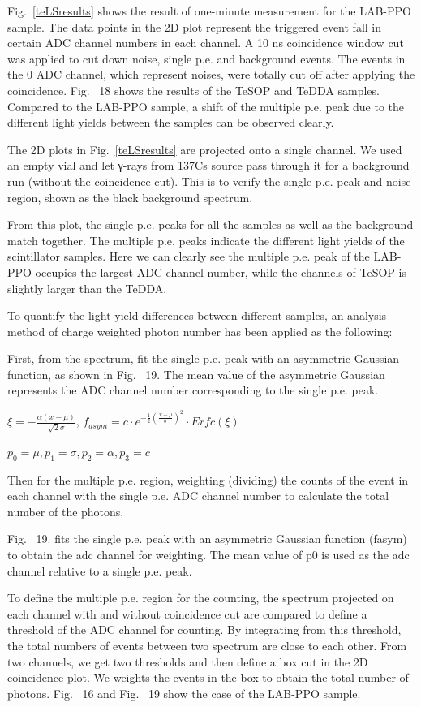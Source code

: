 Fig.~\ref{teLSresults} shows the result of one-minute measurement for the LAB-PPO sample. The data points in the 2D plot represent the triggered event fall in certain ADC channel numbers in each channel. A 10 ns coincidence window cut was applied to cut down noise, single p.e. and background events. The events in the 0 ADC channel, which represent noises, were totally cut off after applying the coincidence. Fig.~ 18 shows the results of the TeSOP and TeDDA samples.  Compared to the LAB-PPO sample, a shift of the multiple p.e. peak due to the different light yields between the samples can be observed clearly.

The 2D plots in Fig.~\ref{teLSresults} are projected onto a single channel. We used an empty vial and let γ-rays from 137Cs source pass through it for a background run (without the coincidence cut). This is to verify the single p.e. peak and noise region, shown as the black background spectrum.

From this plot, the single p.e. peaks for all the samples as well as the background match together. The multiple p.e. peaks indicate the different light yields of the scintillator samples. Here we can clearly see the multiple p.e. peak of the LAB-PPO occupies the largest ADC channel number, while the channels of TeSOP is slightly larger than the TeDDA. 

To quantify the light yield differences between different samples, an analysis method of charge weighted photon number has been applied as the following:

First, from the spectrum, fit the single p.e. peak with an asymmetric Gaussian function, as shown in Fig.~ 19. The mean value of the asymmetric Gaussian represents the ADC channel number corresponding to the single p.e. peak.

$\xi=-\frac{\alpha(x-\mu)}{\sqrt 2\sigma}$,
$f_{asym}=c\cdot e^{-\frac{1}{2}(\frac{x-\mu}{\sigma})^2}\cdot Erfc(\xi)$

$p_0=\mu,p_1=\sigma,p_2=\alpha, p_3=c$ 

Then for the multiple p.e. region, weighting (dividing) the counts of the event in each channel with the single p.e. ADC channel number to calculate the total number of the photons.

Fig.~ 19. fits the single p.e. peak with an asymmetric Gaussian function (fasym) to obtain the adc channel for weighting. The mean value of p0 is used as the adc channel relative to a single p.e. peak.

To define the multiple p.e. region for the counting, the spectrum projected on each channel with and without coincidence cut are compared to define a threshold of the ADC channel for counting. By integrating from this threshold, the total numbers of events between two spectrum are close to each other. From two channels, we get two thresholds and then define a box cut in the 2D coincidence plot. We weights the events in the box to obtain the total number of photons. Fig.~ 16 and Fig.~ 19 show the case of the LAB-PPO sample.

